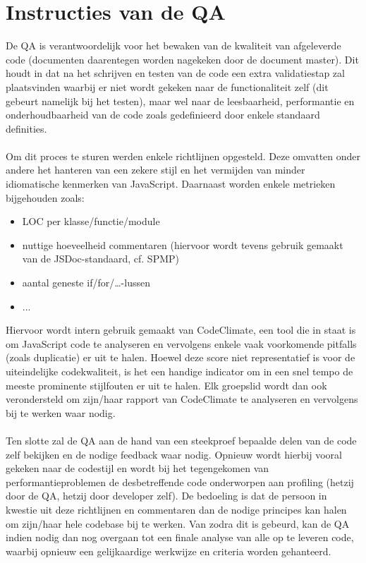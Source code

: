 \documentclass{article}
\begin{document}
\section{Instructies van de QA}
De QA is verantwoordelijk voor het bewaken van de kwaliteit van afgeleverde code (documenten daarentegen worden nagekeken door de document master). Dit houdt in dat na het schrijven en testen van de code een extra validatiestap zal plaatsvinden waarbij er niet wordt gekeken naar de functionaliteit zelf (dit gebeurt namelijk bij het testen), maar wel naar de leesbaarheid, performantie en onderhoudbaarheid van de code zoals gedefinieerd door enkele standaard definities. 
\\\\
Om dit proces te sturen werden enkele richtlijnen opgesteld. Deze omvatten onder andere het hanteren van een zekere stijl en het vermijden van minder idiomatische kenmerken van JavaScript. Daarnaast worden enkele metrieken bijgehouden zoals:\\
\begin{itemize}
\item LOC per klasse/functie/module
\item nuttige hoeveelheid commentaren (hiervoor wordt tevens gebruik gemaakt van de JSDoc-standaard, cf. SPMP)
\item aantal geneste if/for/…-lussen
\item ...
\end{itemize}
Hiervoor wordt intern gebruik gemaakt van CodeClimate, een tool die in staat is om JavaScript code te analyseren en vervolgens enkele vaak voorkomende pitfalls (zoals duplicatie) er uit te halen. Hoewel deze score niet representatief is voor de uiteindelijke codekwaliteit, is het een handige indicator om in een snel tempo de meeste prominente stijlfouten er uit te halen. Elk groepslid wordt dan ook verondersteld om zijn/haar rapport van CodeClimate te analyseren en vervolgens bij te werken waar nodig.
\\\\
Ten slotte zal de QA aan de hand van een steekproef bepaalde delen van de code zelf bekijken en de nodige feedback waar nodig. Opnieuw wordt hierbij vooral gekeken naar de codestijl en wordt bij het tegengekomen van performantieproblemen de desbetreffende code onderworpen aan profiling (hetzij door de QA, hetzij door developer zelf). De bedoeling is dat de persoon in kwestie uit deze richtlijnen en commentaren dan de nodige principes kan halen om zijn/haar hele codebase bij te werken. Van zodra dit is gebeurd, kan de QA indien nodig dan nog overgaan tot een finale analyse van alle op te leveren code, waarbij opnieuw een gelijkaardige werkwijze en criteria worden gehanteerd.
%
\clearpage
%
\end{document}
